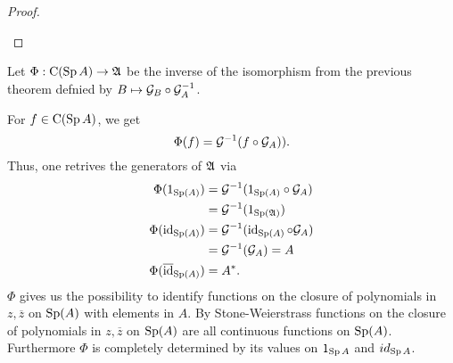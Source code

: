 \begin{proof}
 \begin{center}
 \end{center}

 




\end{proof}

\begin{rem}
  Let $\Phi : \operatorname{C} (\operatorname{Sp} A) \to \mathfrak{A}$ be the inverse of the isomorphism from the
  previous theorem defnied by $B \mapsto \mathcal{G}_B \circ \mathcal{G}_A ^{-1}$.
 
  For $f \in \operatorname{C}(\operatorname{Sp} A)$, we get 
  \[
   \Phi (f) = \mathcal{G} ^{-1} (f \circ \mathcal{G}_A)).
  \]
  Thus, one retrives the generators of $\mathfrak{A}$ via
   \begin{align*}
      \Phi (1_{\operatorname{Sp}(A)})   		&= \mathcal{G} ^{-1} (1 _{\operatorname{Sp}(A)} \circ \mathcal{G}_A ) \\
				    &= \mathcal{G} ^{-1} (1_{\operatorname{Sp}(\mathfrak{A})}) \\
      \Phi (\operatorname{id}_{\operatorname{Sp} (A)})		&= \mathcal{G} ^{-1} (\operatorname{id}_{\operatorname{Sp} (A)} \circ \mathcal{G}_A) \\
				    &= \mathcal{G} ^{-1} (\mathcal{G}_A) = A \\
      \Phi (\overline{\operatorname{id}}_{\operatorname{Sp} (A)}) 	&= A^*.
   \end{align*}
  $\Phi$ gives us the possibility to identify functions on the closure of
  polynomials in $z, \overline{z}$ on $\operatorname{Sp} (A)$ with elements in $A$. 
  By Stone-Weierstrass functions on the closure of polynomials in 
  $z, \overline{z}$ on $\operatorname{Sp} (A)$ are all continuous functions on $\operatorname{Sp} (A)$.
  Furthermore  $\Phi$ is completely determined by its values on $1_{\operatorname{Sp} A}$ 
  and $id_{\operatorname{Sp} A}$.
\end{rem}

